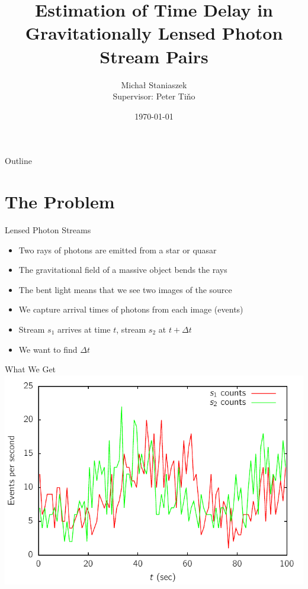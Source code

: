\documentclass{beamer}
\title[Photon Time Delay Estimation] %
{Estimation of Time Delay in Gravitationally Lensed Photon Stream Pairs}
\author[Micha{\l} Staniaszek]{\large{Micha{\l} Staniaszek} \\ \scriptsize{Supervisor: Peter Ti\v{n}o}}
\institute[bham]{The University of Birmingham}
\date{\today}
\begin{document}
\begin{frame}
  \titlepage
\end{frame}

\begin{frame}{Outline}
  \tableofcontents
\end{frame}

\section{The Problem}

\begin{frame}{Lensed Photon Streams}
  \begin{itemize}
  \item<1-> Two rays of photons are emitted from a star or quasar
  \item<2-> The gravitational field of a massive object bends the rays
  \item<3-> The bent light means that we see two images of the source
  \item<4-> We capture arrival times of photons from each image (events)
  \item<5-> Stream $s_1$ arrives at time $t$, stream $s_2$ at $t + \Delta t$
  \item<6-> We want to find $\Delta t$
  \end{itemize}
\end{frame}

\begin{frame}{What We Get}
  \includegraphics[width=\textwidth]{twostreams_counts}
\end{frame}
\end{document}
